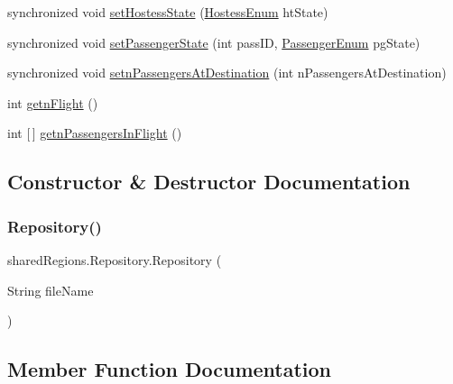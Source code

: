 \begin{DoxyCompactItemize}
\item 
synchronized void \hyperlink{classshared_regions_1_1_repository_aac95a1347f2c12608593f45eb3e7cbdd}{set\+Hostess\+State} (\hyperlink{enumentities_1_1_hostess_enum}{Hostess\+Enum} ht\+State)
\item 
synchronized void \hyperlink{classshared_regions_1_1_repository_a112f179c04b8e8c76afd4150f105315d}{set\+Passenger\+State} (int pass\+ID, \hyperlink{enumentities_1_1_passenger_enum}{Passenger\+Enum} pg\+State)
\item 
synchronized void \hyperlink{classshared_regions_1_1_repository_ae5c7a992aa4d5d14f4d1887718ad100c}{setn\+Passengers\+At\+Destination} (int n\+Passengers\+At\+Destination)
\item 
int \hyperlink{classshared_regions_1_1_repository_a7b00c4a1f9c60c34b87c9106eb7908c4}{getn\+Flight} ()
\item 
int \mbox{[}$\,$\mbox{]} \hyperlink{classshared_regions_1_1_repository_a72428c11fc633123613011915c19207a}{getn\+Passengers\+In\+Flight} ()
\end{DoxyCompactItemize}


\subsection{Constructor \& Destructor Documentation}
\mbox{\label{classshared_regions_1_1_repository_a977ec108837b2cfa0852d7e94f7f53dc}} 
\subsubsection{\texorpdfstring{Repository()}{Repository()}}
{\footnotesize\ttfamily shared\+Regions.\+Repository.\+Repository (\begin{DoxyParamCaption}\item[{String}]{file\+Name }\end{DoxyParamCaption})}



\subsection{Member Function Documentation}
\mbox{\label{classshared_regions_1_1_repository_a7b00c4a1f9c60c34b87c9106eb7908c4}} 

